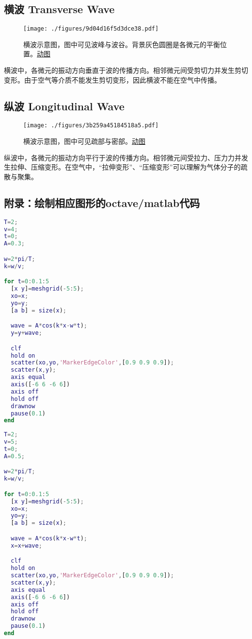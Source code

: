 
\subsection{横波 Transverse Wave}
\begin{figure}[ht]
\centering
\texttt{[image: ./figures/9d04d16f5d3dce38.pdf]}
\caption{横波示意图，图中可见波峰与波谷。背景灰色圆圈是各微元的平衡位置。\href{https://wuli.wiki/apps/waves.html}{动图}} \label{fig_LAT_1}
\end{figure}
横波中，各微元的振动方向垂直于波的传播方向。相邻微元间受剪切力并发生剪切变形。由于空气等介质不能发生剪切变形，因此横波不能在空气中传播。

\subsection{纵波 Longitudinal Wave}
\begin{figure}[ht]
\centering
\texttt{[image: ./figures/3b259a45184518a5.pdf]}
\caption{横波示意图，图中可见疏部与密部。\href{https://wuli.wiki/apps/waves.html}{动图}} \label{fig_LAT_2}
\end{figure}
纵波中，各微元的振动方向平行于波的传播方向。相邻微元间受拉力、压力力并发生拉伸、压缩变形。在空气中，“拉伸变形”、“压缩变形”可以理解为气体分子的疏散与聚集。

\subsection{附录：绘制相应图形的octave/matlab代码}
\begin{lstlisting}[language=matlab]
%绘制横波
T=2;
v=4;
t=0;
A=0.3;

w=2*pi/T;
k=w/v;

for t=0:0.1:5
  [x y]=meshgrid(-5:5);
  xo=x;
  yo=y;
  [a b] = size(x);

  wave = A*cos(k*x-w*t);
  y=y+wave;

  clf
  hold on
  scatter(xo,yo,'MarkerEdgeColor',[0.9 0.9 0.9]);
  scatter(x,y);
  axis equal
  axis([-6 6 -6 6])
  axis off
  hold off
  drawnow
  pause(0.1)
end

\end{lstlisting}

\begin{lstlisting}[language=matlab]
%绘制纵波
T=2;
v=5;
t=0;
A=0.5;

w=2*pi/T;
k=w/v;

for t=0:0.1:5
  [x y]=meshgrid(-5:5);
  xo=x;
  yo=y;
  [a b] = size(x);

  wave = A*cos(k*x-w*t);
  x=x+wave;

  clf
  hold on
  scatter(xo,yo,'MarkerEdgeColor',[0.9 0.9 0.9]);
  scatter(x,y);
  axis equal
  axis([-6 6 -6 6])
  axis off
  hold off
  drawnow
  pause(0.1)
end
\end{lstlisting}
